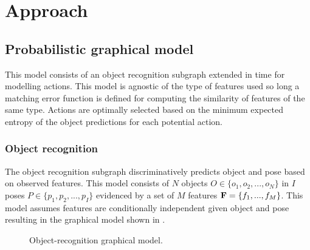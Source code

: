 \section{Approach}


    \subsection{Probabilistic graphical model}
        This model consists of an object recognition subgraph extended in time for modelling actions. This model is agnostic of the type of features used so long a matching error function is defined for computing the similarity of features of the same type. Actions are optimally selected based on the minimum expected entropy of the object predictions for each potential action.
            
        \subsubsection{Object recognition}
            The object recognition subgraph discriminatively predicts object and pose based on observed features. This model consists of $N$ objects $O \in \{o_1,o_2, ..., o_N\}$ in $I$ poses $P \in \{p_1,p_2, ..., p_I\}$ evidenced by a set of $M$ features $\mathbf{F} = \left\{ f_1, ...,  f_M\right\}$. This model assumes features are conditionally independent given object and pose resulting in the graphical model shown in .

            \begin{figure}[h]
              \centering
              \caption{Object-recognition graphical model.}
              \label{fig:objectRecognitionSubgraph}
            \end{figure}

